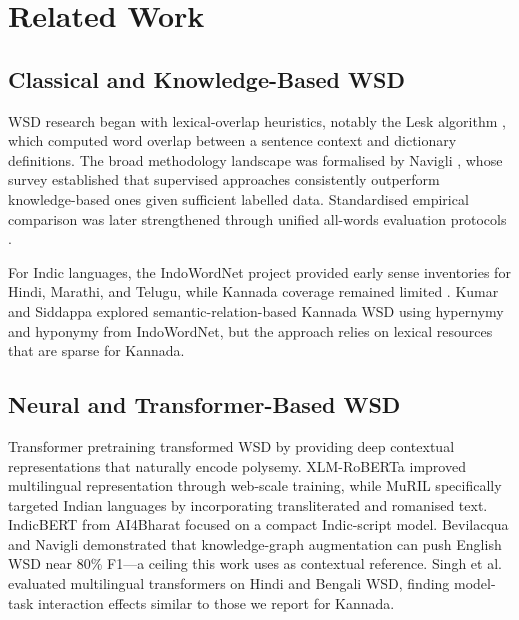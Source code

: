 \documentclass{ieeeaccess}
\begin{document}
\section{Related Work}
\label{sec:related}

\subsection{Classical and Knowledge-Based WSD}

WSD research began with lexical-overlap heuristics, notably the Lesk
algorithm \cite{lesk1986}, which computed word overlap between a sentence
context and dictionary definitions.
The broad methodology landscape was formalised by Navigli \cite{navigli2009},
whose survey established that supervised approaches consistently outperform
knowledge-based ones given sufficient labelled data.
Standardised empirical comparison was later strengthened through unified
all-words evaluation protocols \cite{raganato2017}.

For Indic languages, the IndoWordNet project provided early sense inventories
for Hindi, Marathi, and Telugu, while Kannada coverage remained limited
\cite{kakwani2020}.
Kumar and Siddappa \cite{kumar2022} explored semantic-relation-based Kannada
WSD using hypernymy and hyponymy from IndoWordNet, but the approach relies on
lexical resources that are sparse for Kannada.

\subsection{Neural and Transformer-Based WSD}

Transformer pretraining \cite{devlin2019} transformed WSD by providing deep
contextual representations that naturally encode polysemy.
XLM-RoBERTa \cite{conneau2020} improved multilingual representation through
web-scale training, while MuRIL \cite{khanuja2021} specifically targeted
Indian languages by incorporating transliterated and romanised text.
IndicBERT \cite{kakwani2020} from AI4Bharat focused on a compact Indic-script
model.
Bevilacqua and Navigli \cite{bevilacqua2020} demonstrated that knowledge-graph
augmentation can push English WSD near 80\% F1---a ceiling this work uses as
contextual reference.
Singh et al.\ \cite{singh2021} evaluated multilingual transformers on Hindi
and Bengali WSD, finding model-task interaction effects similar to those we
report for Kannada.
\end{document}
